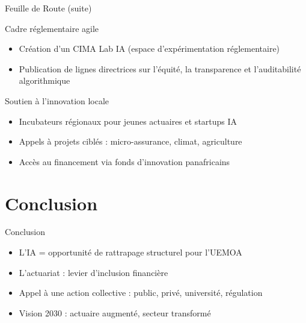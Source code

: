 \documentclass{beamer}
\begin{document}
\begin{frame}{Feuille de Route (suite)}
	\begin{block}{Cadre réglementaire agile}
		\begin{itemize}
			\item Création d’un CIMA Lab IA (espace d’expérimentation réglementaire)
			\item Publication de lignes directrices sur l’équité, la transparence et l’auditabilité algorithmique
		\end{itemize}
	\end{block}
	
	\begin{block}{Soutien à l’innovation locale}
		\begin{itemize}
			\item Incubateurs régionaux pour jeunes actuaires et startups IA
			\item Appels à projets ciblés : micro-assurance, climat, agriculture
			\item Accès au financement via fonds d’innovation panafricains
		\end{itemize}
	\end{block}
\end{frame}


\section{Conclusion}
\begin{frame}{Conclusion}
	\begin{block}{}
	\begin{itemize}
		\item L’IA = opportunité de rattrapage structurel pour l’UEMOA
		\item L’actuariat : levier d’inclusion financière
		\item Appel à une action collective : public, privé, université, régulation
		\item Vision 2030 : actuaire augmenté, secteur transformé
	\end{itemize}
	\end{block}
\end{frame}
\end{document}
